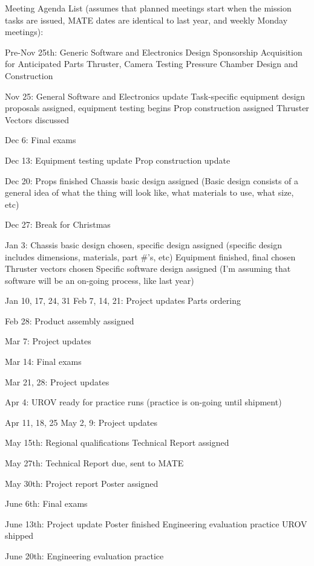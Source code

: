 \documentclass{proposalnsf}
\begin{document}
Meeting Agenda List (assumes that planned meetings start when the
mission tasks are issued, MATE dates are identical to last year, and
weekly Monday meetings):

Pre-Nov 25th:
     Generic Software and Electronics Design
     Sponsorship Acquisition for Anticipated Parts
     Thruster, Camera Testing
     Pressure Chamber Design and Construction

Nov 25:
     General Software and Electronics update
     Task-specific equipment design proposals assigned, equipment
testing begins
     Prop construction assigned
     Thruster Vectors discussed

Dec 6: Final exams

Dec 13:
     Equipment testing update
     Prop construction update

Dec 20:
     Props finished
     Chassis basic design assigned (Basic design consists of a general
idea of what the thing will look like, what materials to use, what
size, etc)

Dec 27:   Break for Christmas

Jan 3:
     Chassis basic design chosen, specific design assigned (specific
design includes dimensions, materials, part \#'s, etc)
     Equipment finished, final chosen
     Thruster vectors chosen
     Specific software design assigned (I'm assuming that software
will be an on-going process, like last year)

Jan 10, 17, 24, 31
Feb 7, 14, 21:
     Project updates
     Parts ordering

Feb 28:
     Product assembly assigned

Mar 7:
     Project updates

Mar 14: Final exams

Mar 21, 28:
     Project updates

Apr 4: UROV ready for practice runs (practice is on-going until
shipment)

Apr 11, 18, 25
May 2, 9:
     Project updates

May 15th:
     Regional qualifications
     Technical Report assigned

May 27th:
     Technical Report due, sent to MATE

May 30th:
     Project report
     Poster assigned

June 6th: Final exams

June 13th:
     Project update
     Poster finished
     Engineering evaluation practice
     UROV shipped

June 20th:
     Engineering evaluation practice
\end{document}
